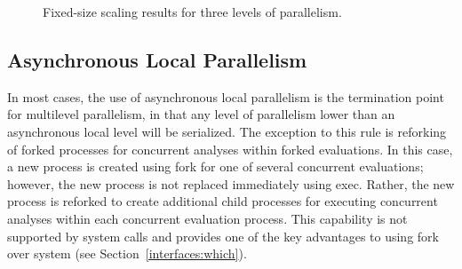 \begin{figure}[ht]
  \centering
  \caption{Fixed-size scaling results for three levels of parallelism.}
  \label{fig:mlp_scaling}
\end{figure}

\subsection{Asynchronous Local Parallelism}\label{parallel:MLP:local}

In most cases, the use of asynchronous local parallelism is the
termination point for multilevel parallelism, in that any level of
parallelism lower than an asynchronous local level will be serialized.
The exception to this rule is reforking of forked processes for
concurrent analyses within forked evaluations.  In this case, a new
process is created using fork for one of several concurrent
evaluations; however, the new process is not replaced immediately
using exec.  Rather, the new process is reforked to create additional
child processes for executing concurrent analyses within each
concurrent evaluation process.  This capability is not supported by
system calls and provides one of the key advantages to using fork over
system (see Section~\ref{interfaces:which}).

